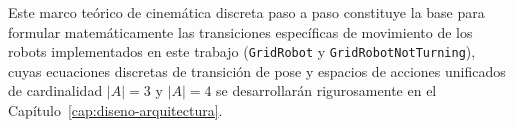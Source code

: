 Este marco teórico de cinemática discreta paso a paso constituye la base para formular matemáticamente las transiciones específicas de movimiento de los robots implementados en este trabajo (\texttt{GridRobot} y \texttt{GridRobotNotTurning}), cuyas ecuaciones discretas de transición de pose y espacios de acciones unificados de cardinalidad $|A|=3$ y $|A|=4$ se desarrollarán rigurosamente en el Capítulo~\ref{cap:diseno-arquitectura}.

